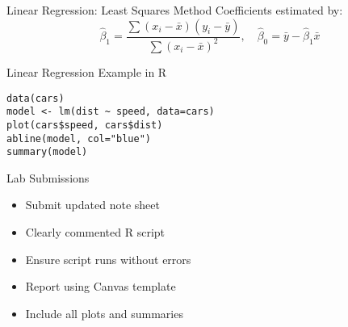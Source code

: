 \documentclass{beamer}
\begin{document}
\begin{frame}{Linear Regression: Least Squares Method}
Coefficients estimated by:
\[
\hat{\beta}_1 = \frac{\sum(x_i - \bar{x})(y_i - \bar{y})}{\sum(x_i - \bar{x})^2}, \quad \hat{\beta}_0 = \bar{y} - \hat{\beta}_1\bar{x}
\]
\end{frame}

\begin{frame}[fragile]{Linear Regression Example in R}
\begin{verbatim}
data(cars)
model <- lm(dist ~ speed, data=cars)
plot(cars$speed, cars$dist)
abline(model, col="blue")
summary(model)
\end{verbatim}
\end{frame}

\begin{frame}{Lab Submissions}
\begin{itemize}
    \item Submit updated note sheet
    \item Clearly commented R script
    \item Ensure script runs without errors
    \item Report using Canvas template
    \item Include all plots and summaries
\end{itemize}
\end{frame}
\end{document}
